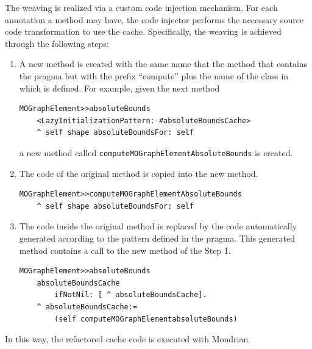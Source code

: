 \documentclass[preprint,10pt]{sigplanconf}
\newcommand{\ct}{\lstinline[backgroundcolor=\color{white},basicstyle=\footnotesize\ttfamily]}
\begin{document}
The weaving is realized via a custom code injection mechanism. For each annotation a method may have, the code injector performs the necessary source code transformation to use the cache. Specifically, the weaving is achieved through the following steps:

\begin{enumerate}
\item A new method is created with the same name that the method that contains
the pragma but with the prefix {}``compute'' plus the name of the
class in which is defined. For example, given the next method
\begin{lstlisting} 
MOGraphElement>>absoluteBounds
	<LazyInitializationPattern: #absoluteBoundsCache> 
	^ self shape absoluteBoundsFor: self
\end{lstlisting}
a new method called \ct{computeMOGraphElementAbsoluteBounds} is created.
\item The code of the original method is copied into the new method.
\begin{lstlisting} 
MOGraphElement>>computeMOGraphElementAbsoluteBounds
	^ self shape absoluteBoundsFor: self
\end{lstlisting}
\item The code inside the original method is replaced by the code automatically
generated according to the pattern defined in the pragma. This generated
method contains a call to the new method of the Step 1.
\begin{lstlisting} 
MOGraphElement>>absoluteBounds
	absoluteBoundsCache 
		ifNotNil: [ ^ absoluteBoundsCache].
	^ absoluteBoundsCache:=
		(self computeMOGraphElementabsoluteBounds)
\end{lstlisting}
\end{enumerate}
In this way, the refactored cache code is executed with Mondrian.
\end{document}
